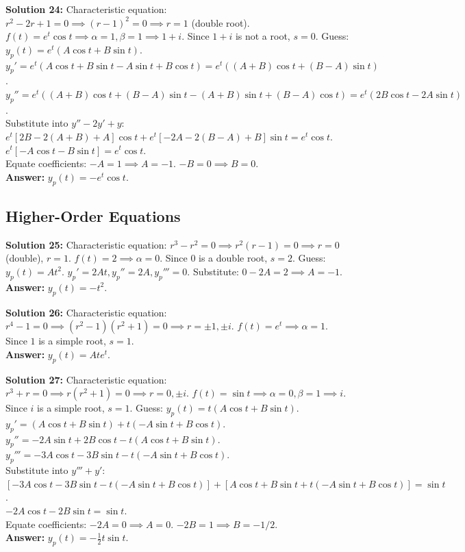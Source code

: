 \documentclass[11pt]{article}
\begin{document}
\textbf{Solution 24:} 
Characteristic equation: $r^2 - 2r + 1 = 0 \implies (r-1)^2 = 0 \implies r = 1$ (double root). 
$f(t) = e^t \cos t \implies \alpha=1, \beta=1 \implies 1+i$. Since $1+i$ is not a root, $s=0$. 
Guess: $y_p(t) = e^t(A\cos t + B\sin t)$. 
$y_p' = e^t(A\cos t + B\sin t - A\sin t + B\cos t) = e^t((A+B)\cos t + (B-A)\sin t)$. \\
$y_p'' = e^t((A+B)\cos t + (B-A)\sin t - (A+B)\sin t + (B-A)\cos t) = e^t(2B\cos t - 2A\sin t)$. \\
Substitute into $y'' - 2y' + y$: \\
$e^t [2B - 2(A+B) + A]\cos t + e^t [-2A - 2(B-A) + B]\sin t = e^t\cos t$. \\
$e^t [-A\cos t - B\sin t] = e^t\cos t$. \\
Equate coefficients: $-A = 1 \implies A = -1$. $-B = 0 \implies B = 0$. \\
\textbf{Answer:} $y_p(t) = -e^t \cos t$.

\subsection*{Higher-Order Equations}

\textbf{Solution 25:} 
Characteristic equation: $r^3 - r^2 = 0 \implies r^2(r-1) = 0 \implies r = 0$ (double), $r = 1$. 
$f(t) = 2 \implies \alpha=0$. Since $0$ is a double root, $s=2$. 
Guess: $y_p(t) = At^2$. 
$y_p' = 2At, y_p'' = 2A, y_p''' = 0$. 
Substitute: $0 - 2A = 2 \implies A = -1$. \\
\textbf{Answer:} $y_p(t) = -t^2$.

\textbf{Solution 26:} 
Characteristic equation: $r^4 - 1 = 0 \implies (r^2-1)(r^2+1) = 0 \implies r = \pm 1, \pm i$. 
$f(t) = e^t \implies \alpha=1$. Since $1$ is a simple root, $s=1$. \\
\textbf{Answer:} $y_p(t) = A t e^t$.

\textbf{Solution 27:} 
Characteristic equation: $r^3 + r = 0 \implies r(r^2+1) = 0 \implies r = 0, \pm i$. 
$f(t) = \sin t \implies \alpha=0, \beta=1 \implies i$. Since $i$ is a simple root, $s=1$. 
Guess: $y_p(t) = t(A\cos t + B\sin t)$. 
$y_p' = (A\cos t + B\sin t) + t(-A\sin t + B\cos t)$. \\
$y_p'' = -2A\sin t + 2B\cos t - t(A\cos t + B\sin t)$. \\
$y_p''' = -3A\cos t - 3B\sin t - t(-A\sin t + B\cos t)$. \\
Substitute into $y''' + y'$: \\
$[-3A\cos t - 3B\sin t - t(-A\sin t + B\cos t)] + [A\cos t + B\sin t + t(-A\sin t + B\cos t)] = \sin t$. \\
$-2A\cos t - 2B\sin t = \sin t$. \\
Equate coefficients: $-2A = 0 \implies A = 0$. $-2B = 1 \implies B = -1/2$. \\
\textbf{Answer:} $y_p(t) = -\frac{1}{2}t\sin t$.
\end{document}
